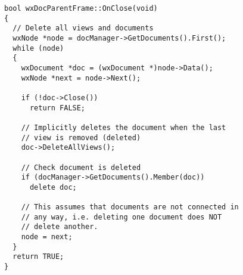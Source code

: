 \begin{verbatim}
bool wxDocParentFrame::OnClose(void)
{
  // Delete all views and documents
  wxNode *node = docManager->GetDocuments().First();
  while (node)
  {
    wxDocument *doc = (wxDocument *)node->Data();
    wxNode *next = node->Next();

    if (!doc->Close())
      return FALSE;

    // Implicitly deletes the document when the last
    // view is removed (deleted)
    doc->DeleteAllViews();

    // Check document is deleted
    if (docManager->GetDocuments().Member(doc))
      delete doc;

    // This assumes that documents are not connected in
    // any way, i.e. deleting one document does NOT
    // delete another.
    node = next;
  }
  return TRUE;
}
\end{verbatim}


